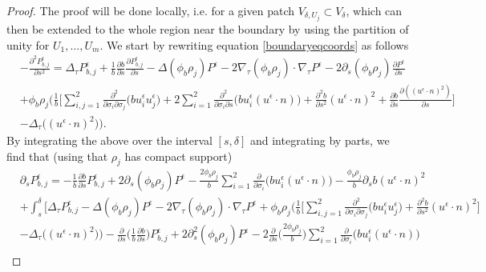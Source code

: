 \documentclass[12pt,a4paper]{article}
\theoremstyle{definition}
\theoremstyle{remark}
\numberwithin{equation}{section}
\begin{document}
\begin{proof}
The proof will be done locally, i.e. for a given patch $V_{\delta,U_j} \subset V_\delta$, which can then be extended to the whole region near the boundary by using the partition of unity for $U_1, \ldots, U_m$. We start by rewriting equation \eqref{boundaryeqcoords} as follows
\begingroup
\allowdisplaybreaks
\begin{align*}
& - \frac{\partial^2 P^\epsilon_{b,j}}{\partial s^2} = \Delta_\tau P^\epsilon_{b,j} + \frac{1}{b} \frac{\partial b}{\partial s} \frac{\partial P^\epsilon_{b,j}}{\partial s} - \Delta (\phi_b \rho_j) P^\epsilon - 2 \nabla_\tau (\phi_b \rho_j) \cdot \nabla_\tau P^\epsilon - 2 \partial_s (\phi_b \rho_j) \frac{\partial P^\epsilon}{\partial s}  \\
&+ \phi_b \rho_j \bigg( \frac{1}{b} \bigg[ \sum_{i,j=1}^2 \frac{\partial^2}{\partial \sigma_i \partial \sigma_j} \big( b u^\epsilon_i u^\epsilon_j \big) + 2 \sum_{i=1}^2 \frac{\partial^2}{\partial \sigma_i \partial s} \big( b u^\epsilon_i (u^\epsilon \cdot n) \big) + \frac{\partial^2 b}{\partial s^2}  (u^\epsilon \cdot n)^2 + \frac{\partial b}{\partial s} \frac{\partial ((u^\epsilon \cdot n)^2)}{\partial s}  \bigg]  \\
&- \Delta_\tau \big( (u^\epsilon \cdot n)^2 \big)  \bigg).
\end{align*}
\endgroup
By integrating the above over the interval $[s, \delta]$ and integrating by parts, we find that (using that $\rho_j$ has compact support)
\begingroup
\allowdisplaybreaks
\begin{align*}
&\partial_s P^\epsilon_{b,j} = -\frac{1}{b} \frac{\partial b}{\partial s} P^\epsilon_{b,j} + 2 \partial_s (\phi_b \rho_j) P^\epsilon - \frac{2 \phi_b \rho_j}{b} \sum_{i=1}^2 \frac{\partial}{\partial \sigma_i} \big( b u^\epsilon_i (u^\epsilon \cdot n) \big) - \frac{\phi_b \rho_j}{b} \partial_s b (u^\epsilon \cdot n)^2  \\
&+\int_s^\delta \bigg[ \Delta_\tau P^\epsilon_{b,j} - \Delta (\phi_b \rho_j) P^\epsilon - 2 \nabla_\tau (\phi_b \rho_j) \cdot \nabla_\tau P^\epsilon + \phi_b \rho_j \bigg( \frac{1}{b} \bigg[ \sum_{i,j=1}^2 \frac{\partial^2}{\partial \sigma_i \partial \sigma_j} \big( b u^\epsilon_i u^\epsilon_j \big)  + \frac{\partial^2 b}{\partial s^2}  (u^\epsilon \cdot n)^2  \bigg]  \\
&- \Delta_\tau \big( (u^\epsilon \cdot n)^2 \big)  \bigg) - \frac{\partial}{\partial s} \bigg( \frac{1}{b} \frac{\partial b}{\partial s} \bigg) P^\epsilon_{b,j} + 2 \partial_s^2 (\phi_b \rho_j) P^\epsilon - 2 \frac{\partial}{\partial s} \bigg( \frac{2 \phi_b \rho_j}{b} \bigg) \sum_{i=1}^2 \frac{\partial}{\partial \sigma_i} \big( b u^\epsilon_i (u^\epsilon \cdot n) \big) \\

\end{align*}
\end{proof}
\end{document}
